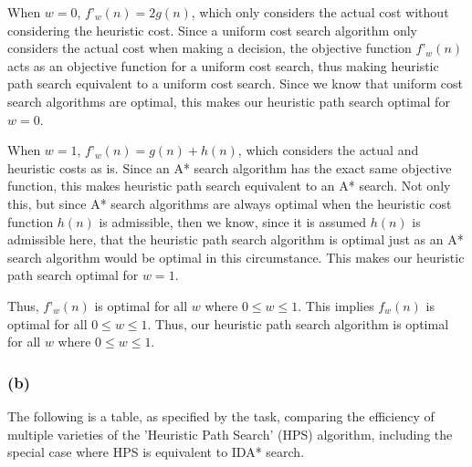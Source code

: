 \documentclass{article}
\begin{document}
When $w = 0$, $f’_w(n) = 2g(n)$, which only considers the actual cost without considering the heuristic cost. Since a uniform cost search algorithm only considers the actual cost when making a decision, the objective function $f’_w(n)$ acts as an objective function for a uniform cost search, thus making heuristic path search equivalent to a uniform cost search. Since we know that uniform cost search algorithms are optimal, this makes our heuristic path search optimal for $w = 0$.

When $w = 1$, $f’_w(n) = g(n) + h(n)$, which considers the actual and heuristic costs as is. Since an A* search algorithm has the exact same objective function, this makes heuristic path search equivalent to an A* search. Not only this, but since A* search algorithms are always optimal when the heuristic cost function $h(n)$ is admissible, then we know, since it is assumed $h(n)$ is admissible here, that the heuristic path search algorithm is optimal just as an A* search algorithm would be optimal in this circumstance. This makes our heuristic path search optimal for $w = 1$.

Thus, $f’_w(n)$ is optimal for all $w$ where $0 \leq w \leq 1$. This implies $f_w(n)$ is optimal for all $0 \leq w \leq 1$. Thus, our heuristic path search algorithm is optimal for all $w$ where $0 \leq w \leq 1$.


\subsubsection*{(b)}
The following is a table, as specified by the task, comparing the efficiency of multiple varieties of the 'Heuristic Path Search' (HPS) algorithm, including the special case where HPS is equivalent to IDA* search.
\end{document}
